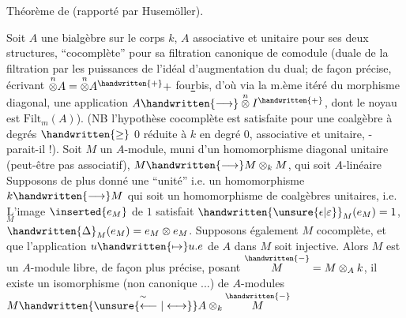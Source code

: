 Théorème de \handwritten{- - - - - -} (rapporté par Husemöller).

Soit $A$ une bialgèbre sur le corps $k$, $A$ associative et unitaire pour ses deux structures, ``cocomplète'' pour sa filtration canonique de comodule (duale de la filtration par les puissances de l'idéal d'augmentation du dual; de façon précise, écrivant $\overset{n}{\otimes}A=\overset{n}{\otimes}A^{\handwritten{+}}+$ fou\uline{r}bis, d'où via la m.ème itéré du morphisme diagonal, une application $A\handwritten{\longrightarrow}\overset{n}{\otimes}I^{\handwritten{+}}$, dont le noyau est $\mathrm{Filt}_{m}(A)$). (NB l'hypothèse cocomplète est satisfaite pour une coalgèbre  à degrés $\handwritten{\geq}$ $0$ réduite à $k$ en degré $0$, associative et unitaire, - parait-il !). Soit $M$ un $A$-module, muni d'un homomorphisme diagonal  unitaire (peut-être pas associatif), $M\handwritten{\longrightarrow}M\otimes_{k}M$, qui soit $A$-linéaire Supposons de plus donné une ``unité'' i.e. un homomorphisme $k\handwritten{\longrightarrow}M$ qui soit un homomorphisme de coalgèbres unitaires, i.e. $\underset{M}{\mathrm{L}}$'image $\inserted{e_{M}}$ de $1$ satisfait $\handwritten{\unsure{\epsilon|\varepsilon}}_{M}(e_{M})=1$, $\handwritten{\Delta}_{M}(e_{M})=e_{M}\otimes e_{M}$. Supposons également $M$ cocomplète, et que l'application $u\handwritten{\mapsto}u.e$ de $A$ dans $M$ soit injective. Alors $M$ est un $A$-module libre,  de façon plus précise, posant $\overset{\handwritten{-}}{M}=M\otimes_{A}k$, il existe un isomorphisme (non canonique ...) de $A$-modules $M\handwritten{\overset{\sim}{\unsure{\longleftarrow|\longleftrightarrow}}}A\otimes_{k}\overset{\handwritten{-}}{M}$

